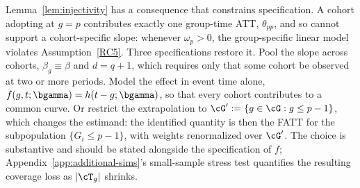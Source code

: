 \documentclass{article}
\begin{document}
\begin{remark}\label{rem:last-cohort}
Lemma~\ref{lem:injectivity} has a consequence that constrains specification. A cohort adopting at $g = p$ contributes exactly one group-time ATT, $\theta_{pp}$, and so cannot support a cohort-specific slope: whenever $\omega_p > 0$, the group-specific linear model violates Assumption~\ref{RC5}. Three specifications restore it. Pool the slope across cohorts, $\beta_g \equiv \beta$ and $d = q+1$, which requires only that some cohort be observed at two or more periods. Model the effect in event time alone, $f(g,t;\bgamma) = h(t-g;\bgamma)$, so that every cohort contributes to a common curve. Or restrict the extrapolation to $\cG' := \{g \in \cG : g \leq p-1\}$, which changes the estimand: the identified quantity is then the FATT for the subpopulation $\{G_i \leq p-1\}$, with weights renormalized over $\cG'$. The choice is substantive and should be stated alongside the specification of $f$; Appendix~\ref{app:additional-sims}'s small-sample stress test quantifies the resulting coverage loss as $|\cT_g|$ shrinks.
\end{remark}



\end{document}
